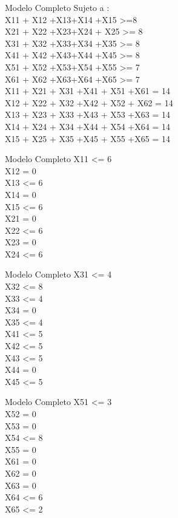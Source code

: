 \documentclass{beamer}
\begin{document}
\begin{frame}[fragile]{Modelo Completo}
Sujeto a :\\
X11 + X12 +X13+X14 +X15 >=8\\
X21 + X22 +X23+X24 + X25 >= 8\\
X31 + X32 +X33+X34 +X35 >= 8\\
X41 + X42 +X43+X44 +X45 >= 8\\
X51 + X52 +X53+X54 +X55 >= 7\\
X61 + X62 +X63+X64 +X65 >= 7\\
X11 + X21 + X31 +X41 + X51 +X61 = 14  \\
X12 + X22 + X32 +X42 + X52 + X62 = 14\\
X13 + X23 + X33 +X43 + X53 +X63 = 14\\
X14 + X24 + X34 +X44 + X54 +X64 = 14\\
X15 + X25 + X35 +X45 + X55 +X65 = 14  \\
\end{frame}
\begin{frame}[fragile]{Modelo Completo}
X11 <= 6\\
        X12 = 0\\
        X13 <= 6\\
        X14  = 0\\
        X15 <= 6\\
        X21 = 0 \\
        X22 <= 6\\
        X23 = 0\\
        X24  <= 6\\
\end{frame}

\begin{frame}[fragile]{Modelo Completo}
X31 <= 4 \\
X32 <= 8\\
X33 <= 4\\
X34  = 0\\
X35 <= 4\\
X41 <= 5 \\
X42 <= 5\\
X43 <= 5\\
X44  = 0\\
X45 <= 5\\
\end{frame}
\begin{frame}[fragile]{Modelo Completo}
X51 <= 3 \\
X52 = 0\\
X53 = 0\\
X54  <=  8\\
X55 = 0\\
X61 = 0 \\
X62 = 0\\
X63 = 0\\
X64  <=  6\\
X65 <= 2\\
\end{frame}
\end{document}
